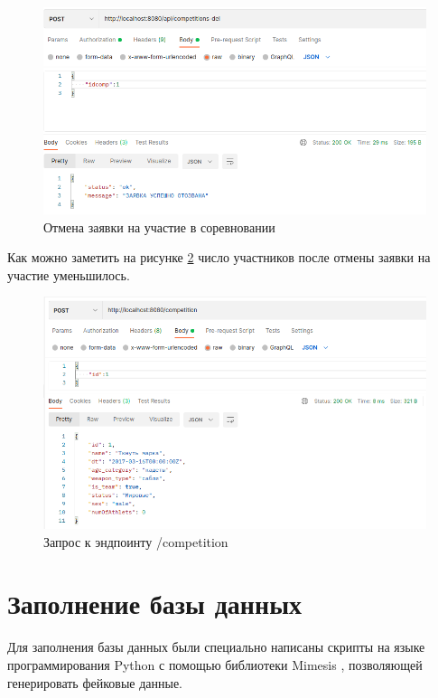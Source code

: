 \begin{figure}[H]
	\includegraphics[width=1\columnwidth]{assets/delRequest.png}
	\centering
	\caption{Отмена заявки на участие в соревновании}
	\label{ris:delRequest}
\end{figure}

Как можно заметить на рисунке \ref{ris:final} число участников после отмены заявки на участие уменьшилось.

\begin{figure}[H]
	\includegraphics[width=1\columnwidth]{assets/final.png}
	\centering
	\caption{Запрос к эндпоинту /competition}
	\label{ris:final}
\end{figure}

\section{Заполнение базы данных}

Для заполнения базы данных были специально написаны скрипты на языке программирования Python \cite{python} с помощью библиотеки Mimesis \cite{mimesis}, позволяющей генерировать фейковые данные.

